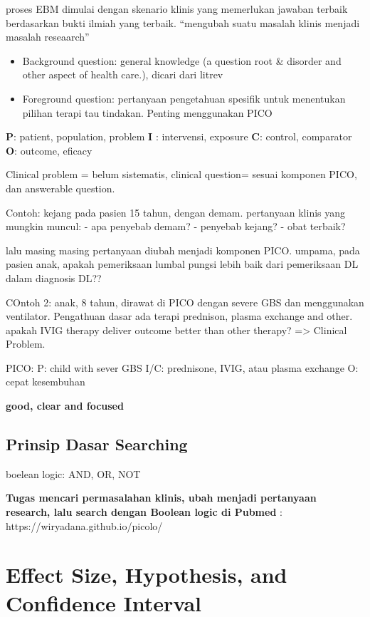 \documentclass[
  letterpaper,
  DIV=11,
  numbers=noendperiod]{scrreprt}
\providecommand{\tightlist}{%
  \setlength{\itemsep}{0pt}\setlength{\parskip}{0pt}}\usepackage{longtable,booktabs,array}
\begin{document}
proses EBM dimulai dengan skenario klinis yang memerlukan jawaban
terbaik berdasarkan bukti ilmiah yang terbaik. ``mengubah suatu masalah
klinis menjadi masalah reseaarch''

\begin{itemize}
\tightlist
\item
  Background question: general knowledge (a question root \& disorder
  and other aspect of health care.), dicari dari litrev
\item
  Foreground question: pertanyaan pengetahuan spesifik untuk menentukan
  pilihan terapi tau tindakan. Penting menggunakan PICO
\end{itemize}

\textbf{P}: patient, population, problem \textbf{I} : intervensi,
exposure \textbf{C}: control, comparator \textbf{O}: outcome, eficacy

Clinical problem = belum sistematis, clinical question= sesuai komponen
PICO, dan answerable question.

Contoh: kejang pada pasien 15 tahun, dengan demam. pertanyaan klinis
yang mungkin muncul: - apa penyebab demam? - penyebab kejang? - obat
terbaik?

lalu masing masing pertanyaan diubah menjadi komponen PICO. umpama, pada
pasien anak, apakah pemeriksaan lumbal pungsi lebih baik dari
pemeriksaan DL dalam diagnosis DL??

COntoh 2: anak, 8 tahun, dirawat di PICO dengan severe GBS dan
menggunakan ventilator. Pengathuan dasar ada terapi prednison, plasma
exchange and other. apakah IVIG therapy deliver outcome better than
other therapy? =\textgreater{} Clinical Problem.

PICO: P: child with sever GBS I/C: prednisone, IVIG, atau plasma
exchange O: cepat kesembuhan

\textbf{good, clear and focused}

\subsection{Prinsip Dasar Searching}\label{prinsip-dasar-searching}

boelean logic: AND, OR, NOT

\textbf{Tugas mencari permasalahan klinis, ubah menjadi pertanyaan
research, lalu search dengan Boolean logic di Pubmed} :
https://wiryadana.github.io/picolo/

\section{Effect Size, Hypothesis, and Confidence
Interval}\label{effect-size-hypothesis-and-confidence-interval}
\end{document}
